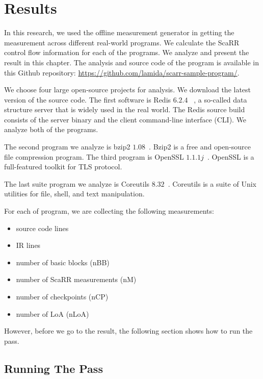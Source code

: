 
\chapter{Results} %

\label{Chapter5} %

In this research, we used the offline measurement generator in getting the
measurement across different real-world programs. We calculate the ScaRR control
flow information for each of the programs. We analyze and present the result in
this chapter. The analysis and source code of the program is available in this
Github repository: \url{https://github.com/lamida/scarr-sample-program/}.

We choose four large open-source projects for analysis. We download the latest
version of the source code. The first software is Redis $6.2.4$
~\cite{RedisRedis2021}, a so-called data structure server that is widely used in
the real world. The Redis source build consists of the server binary and the
client command-line interface (CLI). We analyze both of the programs.

The second program we analyze is bzip2 $1.08$~\cite{Bzip2Bzip2}. Bzip2 is a free
and open-source file compression program. The third program is OpenSSL
$1.1.1j$~\cite{OpensslOpenssl2021}. OpenSSL is a full-featured toolkit for TLS
protocol. 

The last suite program we analyze is Coreutils
$8.32$~\cite{CoreutilsCoreutils2021}. Coreutils is a suite of Unix utilities for
file, shell, and text manipulation.

For each of program, we are collecting the following measurements:

\begin{itemize}
    \item source code lines
    \item IR lines
    \item number of basic blocks (nBB)
    \item number of ScaRR measurements (nM)
    \item number of checkpoints (nCP)
    \item number of LoA (nLoA)
\end{itemize}

However, before we go to the result, the following section shows how to run the
pass.

\section{Running The Pass}

